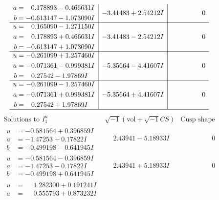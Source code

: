 \documentclass[1p]{elsarticle_modified}
\theoremstyle{definition}
\newcommand{\I}{\sqrt{-1}}
\begin{document}
$$\begin{array}{c|c|c}
\begin{aligned}
a &= \phantom{-}0.178893 - 0.466631 I \\
b &= -0.613147 - 1.073090 I\end{aligned}
 & -3.41483 + 2.54212 I & \phantom{-0.000000 } 0 \\ \hline\begin{aligned}
u &= \phantom{-}0.165090 - 1.271150 I \\
a &= \phantom{-}0.178893 + 0.466631 I \\
b &= -0.613147 + 1.073090 I\end{aligned}
 & -3.41483 - 2.54212 I & \phantom{-0.000000 } 0 \\ \hline\begin{aligned}
u &= -0.261099 + 1.257460 I \\
a &= -0.071361 - 0.999381 I \\
b &= \phantom{-}0.27542 - 1.97869 I\end{aligned}
 & -5.35664 - 4.41607 I & \phantom{-0.000000 } 0 \\ \hline\begin{aligned}
u &= -0.261099 - 1.257460 I \\
a &= -0.071361 + 0.999381 I \\
b &= \phantom{-}0.27542 + 1.97869 I\end{aligned}
 & -5.35664 + 4.41607 I & \phantom{-0.000000 } 0\\
 \hline 
 \end{array}$$\newpage$$\begin{array}{c|c|c}  
\text{Solutions to }I^u_{1}& \I (\text{vol} + \sqrt{-1}CS) & \text{Cusp shape}\\
 \hline 
\begin{aligned}
u &= -0.581564 + 0.396859 I \\
a &= -1.47253 + 0.17822 I \\
b &= -0.499198 - 0.641945 I\end{aligned}
 & \phantom{-}2.43941 - 5.18933 I & \phantom{-0.000000 } 0 \\ \hline\begin{aligned}
u &= -0.581564 - 0.396859 I \\
a &= -1.47253 - 0.17822 I \\
b &= -0.499198 + 0.641945 I\end{aligned}
 & \phantom{-}2.43941 + 5.18933 I & \phantom{-0.000000 } 0 \\ \hline\begin{aligned}
u &= \phantom{-}1.282300 + 0.191241 I \\
a &= \phantom{-}0.555793 + 0.873232 I \\

\end{aligned}
\end{array}$$
\end{document}

